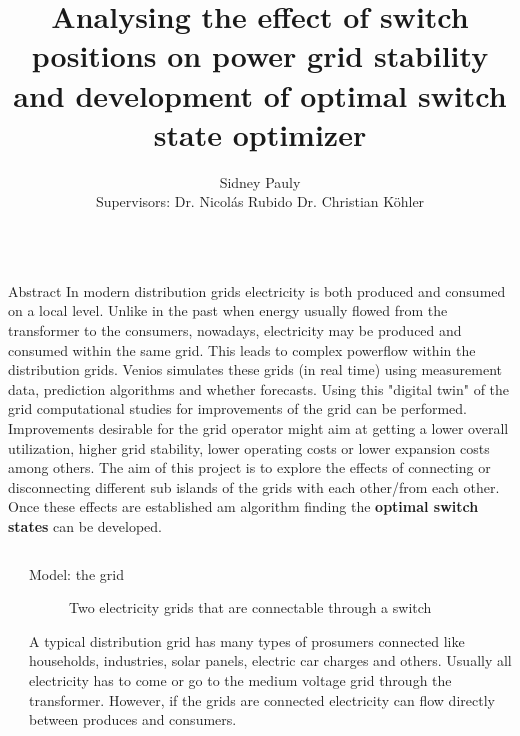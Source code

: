 \documentclass[final]{beamer}
\title{Analysing the effect of switch positions on power grid stability and development of optimal switch state optimizer}
\author{Sidney Pauly\inst{1} \inst{2}\\ Supervisors: Dr. Nicol\'as Rubido\inst{1} Dr. Christian K\"ohler\inst{2}}
\institute[shortinst]{\inst{1} University of Aberdeen \samelineand \inst{2} Venios GmbH}
\newlength{\sepwidth}
\newlength{\colwidth}
\newcommand{\separatorcolumn}{\begin{column}{\sepwidth}\end{column}}
\begin{document}
\begin{frame}[t]

  \begin{columns}[t]

    \begin{column}{}


      \begin{block}{Abstract}
        In modern distribution grids electricity is both produced and consumed on a local level.
        Unlike in the past when energy usually flowed from the transformer to the consumers, nowadays, electricity
        may be produced and consumed within the same grid. This leads to complex powerflow within the distribution
        grids. Venios simulates these grids (in real time) using measurement data, prediction algorithms and whether
        forecasts. Using this "digital twin" of the grid computational studies for improvements of the grid
        can be performed. Improvements desirable for the grid operator might aim at getting a lower overall utilization, higher
        grid stability, lower operating costs or lower expansion costs among others\autocite{Venios}.
        The aim of this project is to explore the effects of connecting or disconnecting different
        sub islands of the grids with each other/from each other. Once these effects are established am algorithm
        finding the \textbf{optimal switch states} can be developed.
      \end{block}

    \end{column}

  \end{columns}

\begin{columns}[t]


\separatorcolumn

\begin{column}{\colwidth}

  \begin{block}{Model: the grid}

    \begin{figure}
      \centering
      
      \caption{Two electricity grids that are connectable through a switch}
      \label{fig:simple_grid}
    \end{figure}

    A typical distribution grid has many types of prosumers connected like households, industries, solar panels, electric car charges and others.
    Usually all electricity has to come or go to the medium voltage grid through the transformer. However, if the grids are connected
    electricity can flow directly between produces and consumers.


\end{block}
\end{column}
\end{columns}
\end{frame}
\end{document}
